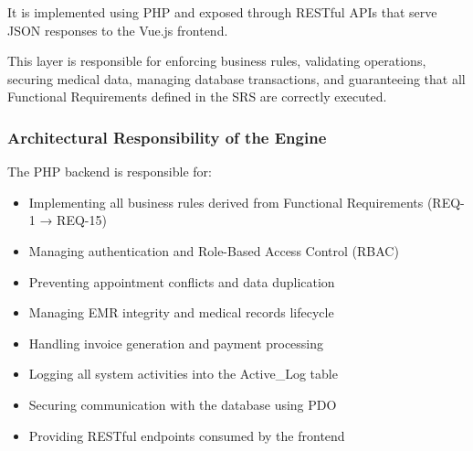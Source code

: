 It is implemented using PHP and exposed through RESTful APIs that serve JSON responses to the Vue.js frontend.

This layer is responsible for enforcing business rules, validating operations, securing medical data, managing database transactions, and guaranteeing that all Functional Requirements defined in the SRS are correctly executed.

\subsubsection{Architectural Responsibility of the Engine}
The PHP backend is responsible for:
\begin{itemize}
	\item Implementing all business rules derived from Functional Requirements (REQ-1 → REQ-15)
	\item Managing authentication and Role-Based Access Control (RBAC)
	\item Preventing appointment conflicts and data duplication
	\item Managing EMR integrity and medical records lifecycle
	\item Handling invoice generation and payment processing
	\item Logging all system activities into the Active\_Log table
	\item Securing communication with the database using PDO
	\item Providing RESTful endpoints consumed by the frontend
\end{itemize}

